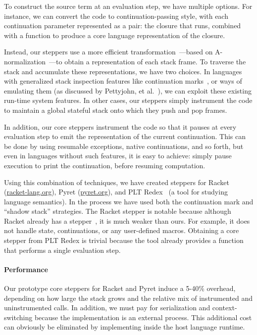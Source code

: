 To construct the source term at an evaluation step, we have multiple
options. For instance,
we can convert the code to continuation-passing style, with each
continuation parameter represented as a pair: the closure that runs,
combined with a function to produce a core language representation of
the closure.

Instead, our steppers use a more efficient
transformation~\cite{continuations-from-stack}---based on
A-normalization~\cite{a-normal-form}---to obtain a representation of
each stack frame. To traverse the stack and accumulate these
representations, we have two choices. In languages with generalized
stack inspection features like continuation
marks~\cite{clements:thesis}, or ways of emulating them (as discussed
by Pettyjohn, et al.~\cite{continuations-from-stack}), we can exploit
these existing run-time system features. In other cases, our steppers simply instrument
the code to maintain a global stateful stack onto which they push and
pop frames.

In addition, our core steppers instrument the code so that it pauses at
every evaluation step to emit the representation of the current
continuation. This can be done by using resumable exceptions, native
continuations, and so forth, but even in languages without such
features, it is easy to achieve: simply pause execution to print the
continuation, before resuming computation.

Using this combination of techniques, we have created steppers for Racket
(\url{racket-lang.org}), Pyret (\url{pyret.org}), and PLT Redex~\cite{redex} (a tool for studying
language semantics). In the
process we have used both the continuation mark and ``shadow stack''
strategies.  The Racket stepper is notable because although Racket
already has a stepper~\cite{racket-stepper},
it is much weaker than ours. For example, it
does not handle state, continuations, or any user-defined
macros. Obtaining a core stepper from PLT Redex is trivial because the tool already
provides a function that performs a single evaluation step.

\paragraph{Performance}

Our prototype core steppers for Racket and Pyret induce a
5-40\% overhead, depending on how large the stack grows and the
relative mix of instrumented and uninstrumented calls. In addition, we
must pay for serialization and context-switching because the
{\Resugarer} implementation is an external process. This additional
cost can obviously be eliminated by implementing {\Resugarer} inside
the host language runtime.

